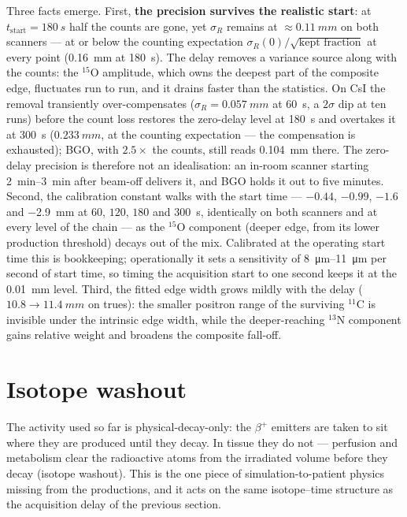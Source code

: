 \documentclass[11pt]{article}
\begin{document}
Three facts emerge. First, \textbf{the precision survives the realistic
start}: at $t_{\text{start}} = \SI{180}{s}$ half the counts are gone,
yet $\sigma_R$ remains at $\approx\SI{0.11}{mm}$ on both scanners ---
at or below the counting expectation
$\sigma_R(0)/\sqrt{\text{kept fraction}}$ at every point
(\SI{0.16}{mm} at \SI{180}{s}). The delay removes a variance source
along with the counts: the $^{15}$O amplitude, which owns the deepest
part of the composite edge, fluctuates run to run, and it drains faster
than the statistics. On CsI the removal transiently over-compensates
($\sigma_R = \SI{0.057}{mm}$ at \SI{60}{s}, a $2\sigma$ dip at ten runs)
before the count loss restores the zero-delay level at \SI{180}{s} and
overtakes it at \SI{300}{s} ($\SI{0.233}{mm}$, at the counting
expectation --- the compensation is exhausted); BGO, with $2.5\times$
the counts, still reads \SI{0.104}{mm} there. The zero-delay precision
is therefore not an idealisation: an in-room scanner starting
\SIrange{2}{3}{min} after beam-off delivers it, and BGO holds it out to
five minutes. Second, the calibration
constant walks with the start time --- $-0.44$, $-0.99$, $-1.6$ and
\SI{-2.9}{mm} at $60$, $120$, $180$ and \SI{300}{s}, identically on both
scanners and at every level of the chain --- as the $^{15}$O component
(deeper edge, from its lower production threshold) decays out of the mix.
Calibrated at the operating start time this is bookkeeping; operationally
it sets a sensitivity of \SIrange{8}{11}{\micro m} per second of start
time, so timing the acquisition start to one second keeps it at the
\SI{0.01}{mm} level. Third, the fitted edge width grows mildly with the
delay ($10.8 \to \SI{11.4}{mm}$ on trues): the smaller positron range of
the surviving $^{11}$C is invisible under the intrinsic edge width, while
the deeper-reaching $^{13}$N component gains relative weight and broadens
the composite fall-off.

\section{Isotope washout}
\label{sec:washout}

The activity used so far is physical-decay-only: the $\beta^+$ emitters are
taken to sit where they are produced until they decay. In tissue they do not
--- perfusion and metabolism clear the radioactive atoms from the irradiated
volume before they decay (isotope washout). This is the one piece of
simulation-to-patient physics missing from the productions, and it acts on the
same isotope--time structure as the acquisition delay of the previous section.
\end{document}
